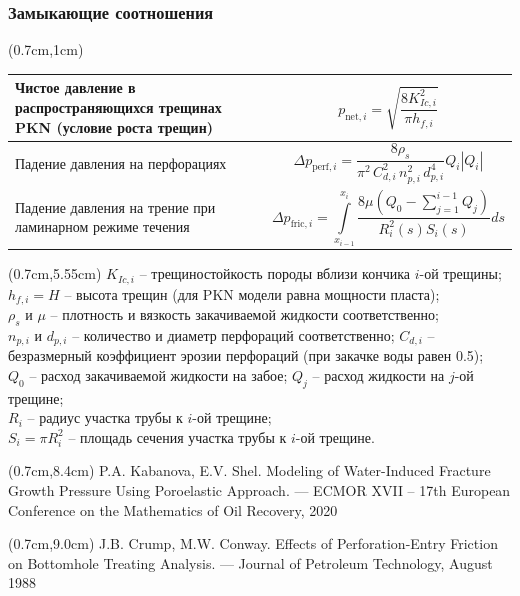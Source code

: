 \documentclass{beamer}
\begin{document}
\begin{frame}
\frametitle{Замыкающие соотношения}
\footnotesize

\begin{textblock*}{11cm}(0.7cm,1cm)
\begin{tabular}{|C{5.5cm}|C{4.9cm}|}
\hline
Чистое давление в распространяющихся трещинах PKN (условие роста трещин)& \vspace*{-4.5mm}$$p_{\text{net},i}=\sqrt{\frac{8K_{Ic,i}^2}{\pi h_{f,i}}}$$\vspace*{-3mm}\\
\hline
Падение давления на перфорациях & \vspace*{-4mm}$$\Delta p_{\text{perf},i}=\frac{8\rho_s}{\pi^2\,C_{d,i}^2\,n_{p,i}^2 \,d_{p,i}^4}Q_i\left|Q_i\right|$$ \vspace*{-3mm}\\
\hline
Падение давления на трение при ламинарном режиме течения & \vspace*{-4mm}$$\Delta p_{\text{fric}, i}=\int\limits_{x_{i-1}}^{x_i}{\frac{8\mu\left(Q_0-\sum\limits_{j=1}^{i-1}{Q_j}\right)}{R_i^2(s)S_i(s)}}ds$$ \vspace*{-4mm}\\
\hline
\end{tabular}
\end{textblock*}


\begin{textblock*}{11.2cm}(0.7cm,5.55cm)
\scriptsize
$K_{Ic,i}$ -- трещиностойкость породы вблизи кончика $i$-ой трещины;
$h_{f,i}=H$ -- высота трещин (для PKN модели равна мощности пласта);\\
$\rho_s$ и $\mu$ -- плотность и вязкость закачиваемой жидкости соответственно;\\
$n_{p,i}$ и $d_{p,i}$ -- количество и диаметр перфораций соответственно;
$C_{d,i}$ -- безразмерный коэффициент эрозии перфораций (при закачке воды равен 0.5);\\
$Q_0$ -- расход закачиваемой жидкости на забое;
$Q_j$ -- расход жидкости на $j$-ой трещине;\\
$R_i$ -- радиус участка трубы к $i$-ой трещине;\\
$S_i=\pi R_i^2$ -- площадь сечения участка трубы к $i$-ой трещине.
\end{textblock*}

\begin{textblock*}{11.2cm}(0.7cm,8.4cm)
\tiny
\textcolor{lit_gray}{P.A. Kabanova, E.V. Shel. Modeling of Water-Induced Fracture Growth Pressure Using Poroelastic Approach. — ECMOR XVII – 17th European Conference on the Mathematics of Oil Recovery, 2020}
\end{textblock*}

\begin{textblock*}{11.2cm}(0.7cm,9.0cm)
\tiny
\textcolor{lit_gray}{J.B. Crump, M.W. Conway. Effects of Perforation-Entry Friction on Bottomhole Treating Analysis. — Journal of Petroleum Technology, August 1988}
\end{textblock*}

\normalsize

\end{frame}
\end{document}
